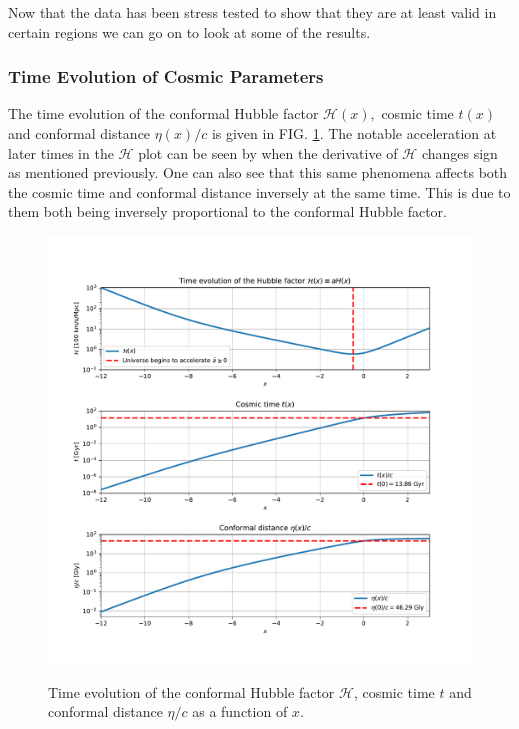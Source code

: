 \documentclass[%
reprint,
 amsmath,amssymb,
 aps,
]{revtex4-2}
\newcommand{\Hp}{\mathcal{H}}
\begin{document}
Now that the data has been stress tested to show that they are at least valid in certain regions we can go on to look at some of the results.
\subsubsection{Time Evolution of  Cosmic Parameters}
The time evolution of the conformal Hubble factor $\Hp(x),$ cosmic time $t(x)$ and conformal distance $\eta(x)/c$ is given in FIG. \ref{fig:TimeEvHp}. The notable acceleration at later times in the $\Hp$ plot can be seen by when the derivative of $\Hp$ changes sign as mentioned previously. One can also see that this same phenomena affects both the cosmic time and conformal distance inversely at the same time. This is due to them both being inversely proportional to the conformal Hubble factor.
\begin{figure}[ht!]
	\caption{Time evolution of the conformal Hubble factor $\Hp$, cosmic time $t$ and conformal distance $\eta/c$ as a function of $x$.}
	\includegraphics[width = \linewidth]{Figures/merge_Hp_t_eta_Ev.pdf}
	\label{fig:TimeEvHp}
\end{figure}
\end{document}
